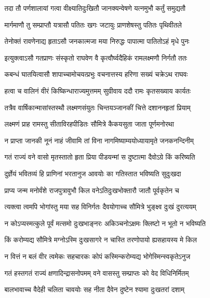 \twolineshloka
{तदा तौ पर्णशालायां गत्वा वीक्ष्यातिदुःखितौ}
{जानक्यन्वेषणे यत्‍नमुभौ कर्तुं समुद्यतौ}%

\twolineshloka
{मार्गमाणौ तु सम्प्राप्तौ यत्रासौ पतितः खगः}
{जटायुः प्राणशेषस्तु पतितः पृथिवीतले}%

\twolineshloka
{तेनोक्तं रावणेनाद्य हृता‍‍ऽसौ जनकात्मजा}
{मया निरुद्धः पापात्मा पातितोऽहं मृधे पुनः}%

\twolineshloka
{इत्युक्त्वाऽसौ गतप्राणः संस्कृतो राघवेण वै}
{कृत्वौर्घ्वदैहिकं रामलक्ष्मणौ निर्गतौ ततः}%

\twolineshloka
{कबन्धं घातयित्वासौ शापाच्चामोचयत्प्रभुः}
{वचनात्तस्य हरिणा सख्यं चक्रेऽथ राघवः}%

\twolineshloka
{हत्वा च वालिनं वीरं किष्किन्धाराज्यमुत्तमम्}
{सुग्रीवाय ददौ रामः कृतसख्याय कार्यतः}%

\twolineshloka
{तत्रैव वार्षिकान्मासांस्तस्थौ लक्ष्मणसंयुतः}
{चिन्तयञ्जानकीं चित्ते दशाननहृतां प्रियाम्}%

\twolineshloka
{लक्ष्मणं प्राह रामस्तु सीताविरहपीडितः}
{सौ‌मित्रे कैकयसुता जाता पूर्णमनोरथा}%

\twolineshloka
{न प्राप्ता जानकी नूनं नाहं जीवामि तां विना}
{नागमिष्याम्ययोध्यायामृते जनकनन्दिनीम्}%

\twolineshloka
{गतं राज्यं वने वासो मृतस्तातो हृता प्रिया}
{पीडयन्मां स दुष्टात्मा दैवो‍ऽग्रे किं करिष्यति}%

\twolineshloka
{दुर्ज्ञेयं भवितव्यं हि प्राणिनां भरतानुज}
{आवयोः का गतिस्तात भविष्यति सुदुःखदा}%

\twolineshloka
{प्राप्य जन्म मनोर्वंशे राजपुत्रावुभौ किल}
{वनेऽतिदुःखभोक्तारौ जातौ पूर्वकृतेन च}%

\twolineshloka
{त्यक्त्वा त्वमपि भोगांस्तु मया सह विनिर्गतः}
{दैवयोगाच्च सौ‌मित्रे भुङ्क्ष्व दुःखं दुरत्ययम्}%

\twolineshloka
{न कोऽप्यस्मत्कुले पूर्वं मत्समो दुःखभाङ्नरः}
{अकिञ्चनोऽक्षमः क्लिष्टो न भूतो न भविष्यति}%

\twolineshloka
{किं करोम्यद्य सौ‌मित्रे मग्नोऽस्मि दुःखसागरे}
{न चास्ति तरणोपायो ह्यसहायस्य मे किल}%

\twolineshloka
{न वित्तं न बलं वीर त्वमेकः सहचारकः}
{कोपं कस्मिन्करोम्यद्य भोगेस्मिन्स्वकृतेऽनुज}%

\twolineshloka
{गतं हस्तगतं राज्यं क्षणादिन्द्रासनोपमम्}
{वने वासस्तु सम्प्राप्तः को वेद विधिनिर्मितम्}%

\twolineshloka
{बालभावाच्च वैदेही चलिता चावयोः सह}
{नीता दैवेन दुष्टेन श्यामा दुःखतरां दशाम्}%

